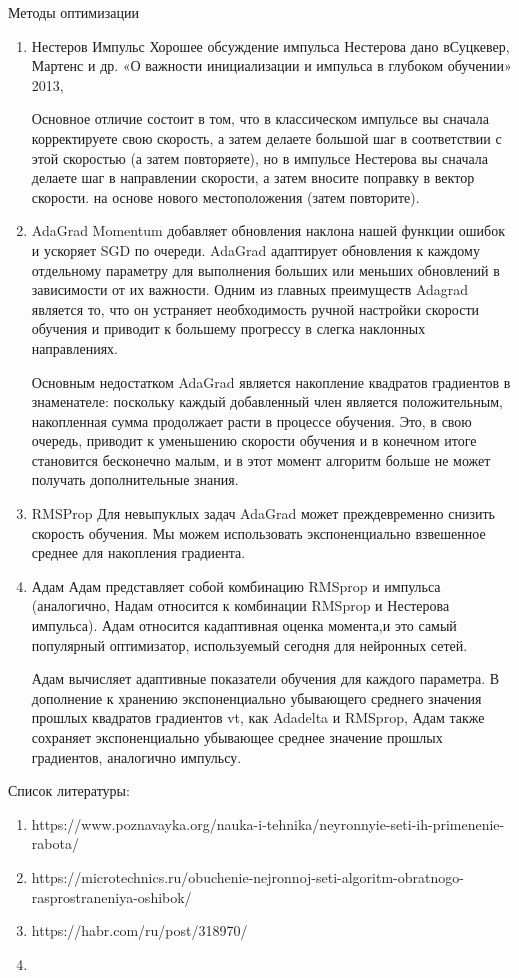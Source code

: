\documentclass[12pt,a4paper]{report}
\begin{document}
Методы оптимизации
\begin{enumerate}
	\item Нестеров Импульс
	Хорошее обсуждение импульса Нестерова дано вСуцкевер, Мартенс и др. «О важности инициализации и импульса в глубоком обучении» 2013,

	Основное отличие состоит в том, что в классическом импульсе вы сначала корректируете свою скорость, а затем делаете большой шаг в соответствии с этой 		скоростью (а затем повторяете), но в импульсе Нестерова вы сначала делаете шаг в направлении скорости, а затем вносите поправку в вектор скорости. на основе 	     нового местоположения (затем повторите).
	\item AdaGrad
	Momentum добавляет обновления наклона нашей функции ошибок и ускоряет SGD по очереди. AdaGrad адаптирует обновления к каждому отдельному параметру для 		выполнения больших или меньших обновлений в зависимости от их важности.
	Одним из главных преимуществ Adagrad является то, что он устраняет необходимость ручной настройки скорости обучения и приводит к большему прогрессу в слегка 	     наклонных направлениях.

	Основным недостатком AdaGrad является накопление квадратов градиентов в знаменателе: поскольку каждый добавленный член является положительным, накопленная 	   сумма продолжает расти в процессе обучения. Это, в свою очередь, приводит к уменьшению скорости обучения и в конечном итоге становится бесконечно малым, и в  	 этот 	момент алгоритм больше не может получать дополнительные знания.
	\item RMSProp
	Для невыпуклых задач AdaGrad может преждевременно снизить скорость обучения. Мы можем использовать экспоненциально взвешенное среднее для накопления 		градиента.
	\item Адам
	Адам представляет собой комбинацию RMSprop и импульса (аналогично, Надам относится к комбинации RMSprop и Нестерова импульса). Адам относится кадаптивная 	  оценка момента,и это самый популярный оптимизатор, используемый сегодня для нейронных сетей.

	Адам вычисляет адаптивные показатели обучения для каждого параметра. В дополнение к хранению экспоненциально убывающего среднего значения прошлых квадратов 	    градиентов vt, как Adadelta и RMSprop, Адам также сохраняет экспоненциально убывающее среднее значение прошлых градиентов, аналогично импульсу. 
\end{enumerate}


Список литературы:
\begin{enumerate}
	\item https://www.poznavayka.org/nauka-i-tehnika/neyronnyie-seti-ih-primenenie-rabota/
	\item https://microtechnics.ru/obuchenie-nejronnoj-seti-algoritm-obratnogo-rasprostraneniya-oshibok/
	\item https://habr.com/ru/post/318970/
	\item
\end{enumerate}
	
\end{document}
